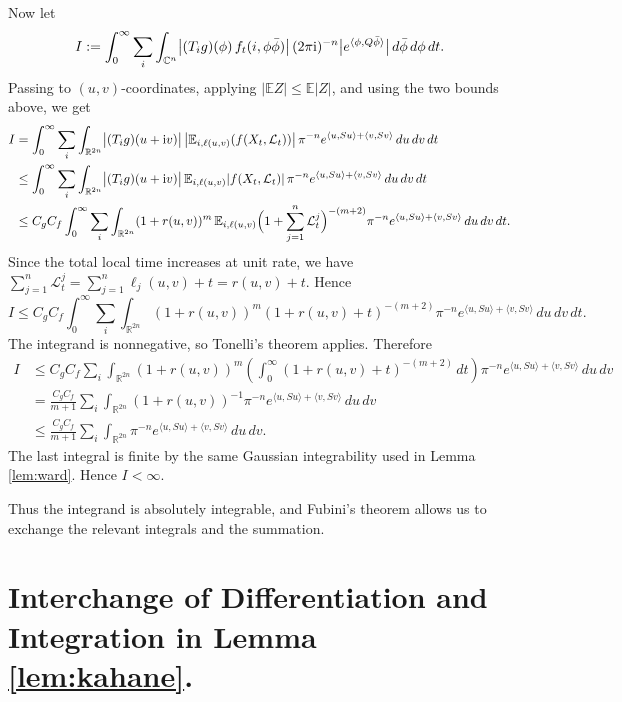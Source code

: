 \documentclass[a4paper, 11pt]{article}
\newcommand{\E}{\mathbb{E}}
\newcommand{\Ell}{\mathcal{L}}
\newcommand{\compi}{\textnormal{i}}
\begin{document}
Now let
\[
I:=\int_0^\infty \sum_i \int_{\mathbb{C}^n}
\bigl|(T_i g)(\phi)\,f_t(i,\phi\bar{\phi})\bigr|\,
(2\pi\compi)^{-n}\bigl|e^{\langle\phi,Q\bar{\phi}\rangle}\bigr|
\,d\bar{\phi}\,d\phi\,dt.
\]
Passing to \((u,v)\)-coordinates, applying \(|\E Z|\le \E|Z|\), and using the two bounds above, we get
\[
\begin{aligned}
I
&=
\int_0^\infty \sum_i \int_{\mathbb{R}^{2n}}
\bigl|(T_i g)(u+\compi v)\bigr|\,
\bigl|\E_{i,\ell(u,v)}(f(X_t,\Ell_t))\bigr|\,
\pi^{-n}e^{\langle u,Su\rangle+\langle v,Sv\rangle}\,du\,dv\,dt \\
&\le
\int_0^\infty \sum_i \int_{\mathbb{R}^{2n}}
\bigl|(T_i g)(u+\compi v)\bigr|\,
\E_{i,\ell(u,v)}|f(X_t,\Ell_t)|\,
\pi^{-n}e^{\langle u,Su\rangle+\langle v,Sv\rangle}\,du\,dv\,dt \\
&\le
C_gC_f
\int_0^\infty \sum_i \int_{\mathbb{R}^{2n}}
(1+r(u,v))^m\,
\E_{i,\ell(u,v)}
\Bigl(1+\sum_{j=1}^n \Ell_t^j\Bigr)^{-(m+2)}
\pi^{-n}e^{\langle u,Su\rangle+\langle v,Sv\rangle}\,du\,dv\,dt.
\end{aligned}
\]
Since the total local time increases at unit rate, we have \(\sum_{j=1}^n \Ell_t^j=\sum_{j=1}^n \ell_j(u,v)+t=r(u,v)+t\). Hence
\[
I
\le
C_gC_f
\int_0^\infty \sum_i \int_{\mathbb{R}^{2n}}
(1+r(u,v))^m(1+r(u,v)+t)^{-(m+2)}
\pi^{-n}e^{\langle u,Su\rangle+\langle v,Sv\rangle}\,du\,dv\,dt.
\]
The integrand is nonnegative, so Tonelli's theorem applies. Therefore
\[
\begin{aligned}
I
&\le
C_gC_f \sum_i \int_{\mathbb{R}^{2n}} (1+r(u,v))^m
\left(\int_0^\infty (1+r(u,v)+t)^{-(m+2)}\,dt\right)
\pi^{-n}e^{\langle u,Su\rangle+\langle v,Sv\rangle}\,du\,dv \\
&=
\frac{C_gC_f}{m+1}
\sum_i \int_{\mathbb{R}^{2n}}
(1+r(u,v))^{-1}
\pi^{-n}e^{\langle u,Su\rangle+\langle v,Sv\rangle}\,du\,dv \\
&\le
\frac{C_gC_f}{m+1}
\sum_i \int_{\mathbb{R}^{2n}}
\pi^{-n}e^{\langle u,Su\rangle+\langle v,Sv\rangle}\,du\,dv .
\end{aligned}
\]
The last integral is finite by the same Gaussian integrability used in Lemma \ref{lem:ward}. Hence \(I<\infty\).

Thus the integrand is absolutely integrable, and Fubini's theorem allows us to exchange the relevant integrals and the summation.

\section{Interchange of Differentiation and Integration in Lemma \ref{lem:kahane}.}
\label{apx:kahane}
\end{document}
